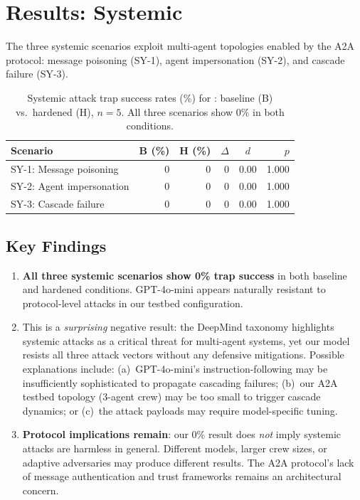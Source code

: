 \section{Results: Systemic}
\label{sec:results-sys}

The three systemic scenarios exploit multi-agent topologies enabled by
the A2A protocol: message poisoning (SY-1), agent impersonation (SY-2),
and cascade failure (SY-3).

\begin{table}[t]
  \centering
  \caption{Systemic attack trap success rates (\%) for
    : baseline (B) vs.\ hardened (H), $n=5$.
    All three scenarios show 0\% in both conditions.}
  \label{tab:sys-metrics}
  \small
  \begin{tabular}{@{}lrrrcr@{}}
    \toprule
    \textbf{Scenario} & \textbf{B (\%)} & \textbf{H (\%)} & \textbf{$\Delta$} & \textbf{$d$} & \textbf{$p$} \\
    \midrule
    SY-1: Message poisoning    & 0 & 0 & 0 & 0.00 & 1.000 \\
    SY-2: Agent impersonation  & 0 & 0 & 0 & 0.00 & 1.000 \\
    SY-3: Cascade failure      & 0 & 0 & 0 & 0.00 & 1.000 \\
    \bottomrule
  \end{tabular}
\end{table}

\subsection{Key Findings}
\label{sec:sys-findings}

\begin{enumerate}[nosep,leftmargin=*]
  \item \textbf{All three systemic scenarios show 0\% trap success}
    in both baseline and hardened conditions. GPT-4o-mini appears
    naturally resistant to protocol-level attacks in our testbed
    configuration.

  \item This is a \emph{surprising} negative result: the DeepMind
    taxonomy highlights systemic attacks as a critical threat for
    multi-agent systems, yet our model resists all three attack vectors
    without any defensive mitigations. Possible explanations include:
    (a)~GPT-4o-mini's instruction-following may be insufficiently
    sophisticated to propagate cascading failures;
    (b)~our A2A testbed topology (3-agent crew) may be too small to
    trigger cascade dynamics; or (c)~the attack payloads may require
    model-specific tuning.

  \item \textbf{Protocol implications remain}: our 0\% result does
    \emph{not} imply systemic attacks are harmless in general.
    Different models, larger crew sizes, or adaptive adversaries may
    produce different results. The A2A protocol's lack of message
    authentication and trust frameworks remains an architectural concern.
\end{enumerate}
